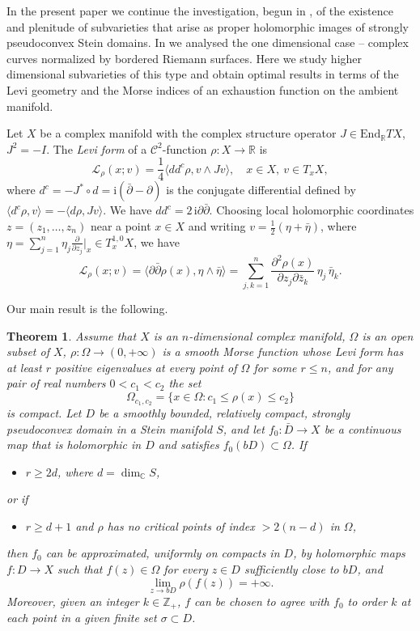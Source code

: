\documentclass[11pt]{amsart}
\numberwithin{equation}{section}
\newtheorem{theorem}{Theorem}[section]
\theoremstyle{definition}
\begin{document}
In the present paper we continue the investigation,
begun in \cite{BDF1}, of the existence and plenitude
of subvarieties that arise as proper holomorphic images 
of strongly pseudoconvex Stein domains.
In \cite{BDF1} we analysed the one dimensional case -- 
complex curves normalized by bordered Riemann surfaces.
Here we study  higher dimensional subvarieties of this type 
and obtain optimal results in terms of the Levi geometry and 
the Morse indices of an exhaustion function on the ambient manifold.

Let $X$ be a complex manifold with the complex structure operator 
$J\in \mathrm{End}_{\mathbb{R}} TX$, $J^2=-I$. 
The {\em Levi form} of a ${\mathcal{C}}^2$-function $\rho\colon X\to {\mathbb{R}}$ is 
\[
	{\mathcal{L}}_\rho(x;v)= \frac{1}{4} \langle dd^c\rho, v\wedge Jv\rangle,
	\quad x\in X, \ v\in T_x X,
\]
where $d^c=-J^* \circ d= \mathrm{i}({\bar\partial} -{\partial})$ is the conjugate differential
defined by $\langle d^c\rho,v\rangle = -\langle d\rho, Jv\rangle$.
We have $dd^c=2\,\mathrm{i} {\partial}{\bar\partial}$. 
Choosing local holomorphic coordinates 
$z=(z_1,\ldots,z_n)$ near a point $x\in X$ and writing 
$v=\frac{1}{2}(\eta +\bar \eta)$,
where $\eta = \sum_{j=1}^n \eta_j\frac{\partial}{{\partial} z_j}|_x \in T^{1,0}_x X$,
we have
\[
	{\mathcal{L}}_\rho(x;v) = 
	\langle {\partial}{\bar\partial} \rho(x), \eta \wedge \bar \eta \rangle
	= \sum_{j,k=1}^n \frac{{\partial}^2 \rho(x)}{{\partial} z_j{\partial} \bar z_k} \,\eta_j\,\bar \eta_k.
\]

Our main result is the following.

\begin{theorem}
\label{Main1}
Assume that $X$ is an $n$-dimensional complex manifold,
$\Omega$ is an open subset of $X$, 
$\rho\colon \Omega\to (0,+\infty)$ is a smooth Morse function 
whose Levi form has at least $r$ positive eigenvalues at every point 
of $\Omega$ for some $r\le n$, 
and for any pair of real numbers $0<c_1<c_2$ the set 
\[
	\Omega_{c_1,c_2}= \{x\in\Omega\colon c_1\le \rho(x)\le c_2\}
\]
is compact. 
Let $D$ be a smoothly bounded, relatively compact, 
strongly pseudoconvex domain in a 
Stein manifold $S$, and let $f_0\colon\bar D\to X$ be a continuous map 
that is holomorphic in $D$ and satisfies $f_0(bD)\subset \Omega$. If
\begin{itemize}
\item[(a)] $r\ge 2d$, where $d=\dim_{\mathbb{C}} S$, 
\end{itemize}
or if
\begin{itemize}
\item[(b)] $r\ge d+1$ and $\rho$ has no critical points of index
$>2(n-d)$ in $\Omega$,
\end{itemize}
then $f_0$ can be approximated, uniformly on compacts in $D$, 
by holomorphic maps $f\colon D\to X$ such that
$f(z)\in \Omega$ for every $z\in D$ sufficiently close to $bD$,
and 
\[
	\lim_{z\to bD} \rho(f(z))=+\infty.
\]
Moreover, given an integer $k\in{\mathbb{Z}}_+$, $f$ can be chosen to agree with 
$f_0$ to order $k$ at each point in a given finite set $\sigma\subset D$. 
\end{theorem}
\end{document}
